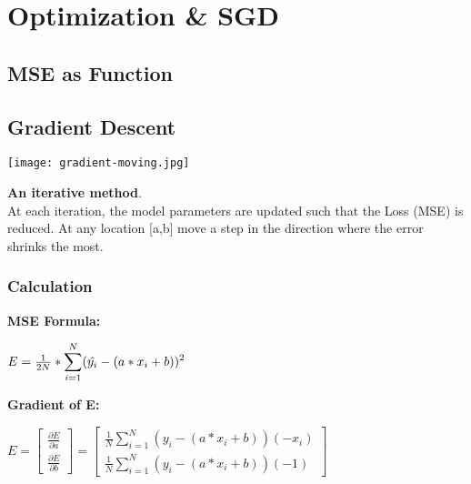 \section{Optimization \& SGD}
\subsection{MSE as Function}

\subsection{Gradient Descent}


\begin{minipage}{0.5\linewidth}
    \begin{center}
        \texttt{[image: gradient-moving.jpg]}
        \vspace{-8pt}
    \end{center}
\end{minipage}
\begin{minipage}{0.45\linewidth}
    \textbf{An iterative method}.\\
    At each iteration, the model parameters are updated such that the Loss (MSE) is reduced.
    At any location [a,b] move a step in the direction where the error shrinks the most.\\
\end{minipage}

\subsubsection{Calculation}
\textbf{MSE Formula:}
\begin{center}
    $E = \frac{1}{2N} * \large\displaystyle\sum_{i = 1}^{N}(\hat{y_i} - (a*x_i + b))^2$
\end{center}
\textbf{Gradient of E:}
\begin{center}
    $
        E = \left[\begin{array}{c} \frac{\partial E}{\partial a} \\ \frac{\partial E}{\partial b} \end{array}\right]
        = \left[\begin{array}{c} \frac{1}{N} \sum_{i=1}^N (y_i - (a * x_i + b))(-x_i) \\ \frac{1}{N} \sum_{i=1}^N (y_i - (a * x_i + b))(-1) \end{array}\right]
    $
\end{center}

